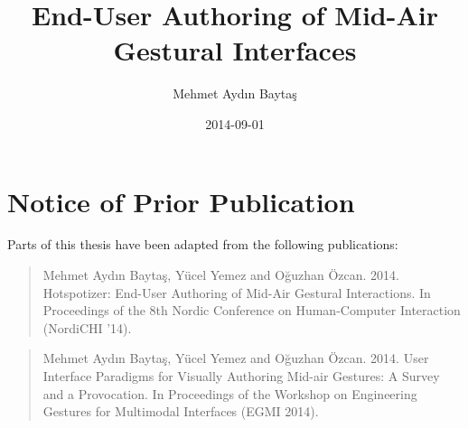 \documentclass[10pt, twoside]{book}
\begin{document}
\frontmatter

\title{End-User Authoring of Mid-Air Gestural Interfaces}
\author{Mehmet Aydın Baytaş}
\date{2014-09-01}

\maketitle
%
%

\chapter*{Notice of Prior Publication}

Parts of this thesis have been adapted from the following publications:

\begin{quote}
Mehmet Aydın Baytaş, Yücel Yemez and Oğuzhan Özcan. 2014. Hotspotizer: End-User Authoring of Mid-Air Gestural Interactions. In Proceedings of the 8th Nordic Conference on Human-Computer Interaction (NordiCHI '14).
\end{quote}

\begin{quote}
Mehmet Aydın Baytaş, Yücel Yemez and Oğuzhan Özcan. 2014. User Interface Paradigms for Visually Authoring Mid-air Gestures: A Survey and a Provocation. In Proceedings of the Workshop on Engineering Gestures for Multimodal Interfaces (EGMI 2014).
\end{quote}

%
%
%
%
%

\setcounter{tocdepth}{1}
\tableofcontents
\end{document}
